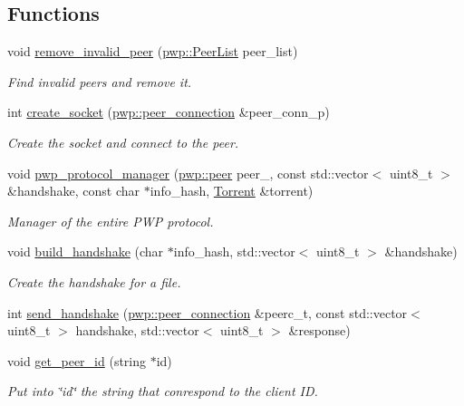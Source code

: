 \subsection*{Functions}
\begin{DoxyCompactItemize}
\item 
void \hyperlink{namespacepwp_ae8331eb5e3c98deddc6022dad92352f6}{remove\+\_\+invalid\+\_\+peer} (\hyperlink{namespacepwp_ad07fa6df116b205302ad5ec172277184}{pwp\+::\+Peer\+List} peer\+\_\+list)
\begin{DoxyCompactList}\small\item\em Find invalid peers and remove it. \end{DoxyCompactList}\item 
int \hyperlink{namespacepwp_a73acf05b954e39825a88036d5793db6b}{create\+\_\+socket} (\hyperlink{structpwp_1_1peer__connection}{pwp\+::peer\+\_\+connection} \&peer\+\_\+conn\+\_\+p)
\begin{DoxyCompactList}\small\item\em Create the socket and connect to the peer. \end{DoxyCompactList}\item 
void \hyperlink{namespacepwp_a62060bdcdc80541b0892e26fbeab1e91}{pwp\+\_\+protocol\+\_\+manager} (\hyperlink{structpwp_1_1peer}{pwp\+::peer} peer\+\_\+, const std\+::vector$<$ uint8\+\_\+t $>$ \&handshake, const char $\ast$info\+\_\+hash, \hyperlink{structtorr_1_1Torrent}{Torrent} \&torrent)
\begin{DoxyCompactList}\small\item\em Manager of the entire P\+WP protocol. \end{DoxyCompactList}\item 
void \hyperlink{namespacepwp_a6062876f4d4d4d6ee19341a79a797864}{build\+\_\+handshake} (char $\ast$info\+\_\+hash, std\+::vector$<$ uint8\+\_\+t $>$ \&handshake)
\begin{DoxyCompactList}\small\item\em Create the handshake for a file. \end{DoxyCompactList}\item 
int \hyperlink{namespacepwp_a851ddc0e8fb2eb0a86317cc944c4a927}{send\+\_\+handshake} (\hyperlink{structpwp_1_1peer__connection}{pwp\+::peer\+\_\+connection} \&peerc\+\_\+t, const std\+::vector$<$ uint8\+\_\+t $>$ handshake, std\+::vector$<$ uint8\+\_\+t $>$ \&response)
\item 
void \hyperlink{namespacepwp_ada6a8613896dbbfd6fba63b17d51684c}{get\+\_\+peer\+\_\+id} (string $\ast$id)
\begin{DoxyCompactList}\small\item\em Put into \char`\"{}id\char`\"{} the string that conrespond to the client ID. \end{DoxyCompactList}\item 

\end{DoxyCompactItemize}
